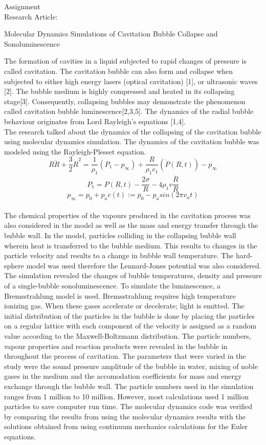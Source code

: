\documentclass[12pt, letterpaper, oneside, article]{memoir}
\begin{document}
Assignment\\

Research Article:\\
\begin{center}
{Molecular Dynamics Simulations of Cavitation Bubble Collapse and Sonoluminescence}
\end{center}

The formation of cavities in a liquid subjected to rapid changes of pressure is called cavitation. The cavitation bubble can also form and collapse when subjected to either high energy lasers (optical cavitation) [1], or ultrasonic waves [2]. The bubble medium is highly compressed and heated in its collapsing stage[3]. Consequently, collapsing bubbles may demonstrate the phenomenon called cavitation bubble luminescence[2,3,5]. The dynamics of the radial bubble behaviour originates from Lord Rayleigh's equations [1,4].\\

The research talked about the dynamics of the collapsing of the cavitation bubble using molecular dynamics simulation. The dynamics of the  cavitation bubble was modeled using the Rayleigh-Plesset equation.
$$R\ddot{R}+\frac{3}{2}\dot{R}^2=\frac{1}{\rho_1}(P_1-p_\infty)+\frac{R}{\rho_1 c_1}(\dot{P}(R,t))-\dot{p_\infty}$$
$$P_1 = P(R,t)-\frac{2\sigma}{R}-4\rho_1 v\frac{\dot{R}}{R}$$
$$p_\infty=p_0+p_ac (t):=p_0 - p_a sin(2 \pi v_a t)$$\\

The chemical properties of the vapours produced in the cavitation process was also considered in the model as well as the mass and energy transfer through the bubble wall. In the model, particles colliding in the collapsing bubble wall wherein heat is transferred to the bubble medium. This results to changes in the particle velocity and results to a change in bubble wall temperature. The hard-sphere model was used therefore the Lennard-Jones potential was also considered. The simulation revealed the changes of bubble temperatures, density and pressure of a single-bubble sonoluminescence. To simulate the luminescence, a Bremsstrahlung model is used. Bremsstrahlung requires high temperature ionizing gas. When these gases accelerate or decelerate; light is emitted. The initial distribution of the particles in the bubble is done by placing the particles on a regular lattice with each component of the velocity is assigned as a random value according to the Maxwell-Boltzmann distribution. The particle numbers, vapour properties and reaction products were revealed in the bubble in throughout the process of cavitation. The parameters that were varied in the study were the sound pressure amplitude of the bubble in water, mixing of noble gases in the medium and the accomodation coefficients for mass and energy exchange through the bubble wall. The particle numbers used in the simulation ranges from 1 million to 10 million. However, most calculations used 1 million particles to save computer run time. The molecular dynamics code was verified by comparing the results from using the molecular dynamics results with the solutions obtained from using continuum mechanics calculations for the Euler equations.\\
\end{document}
